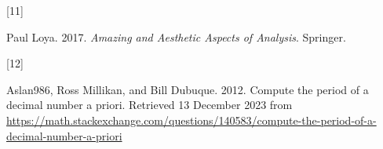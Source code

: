 \documentclass[
  a4paper,
]{article}
\newlength{\cslhangindent}
\newlength{\csllabelwidth}
\newenvironment{CSLReferences}[2] %
 {\begin{list}{}{%
  \setlength{\itemindent}{0pt}
  \setlength{\leftmargin}{0pt}
  \setlength{\parsep}{0pt}
  \ifodd #1
   \setlength{\leftmargin}{\cslhangindent}
   \setlength{\itemindent}{-1\cslhangindent}
  \fi
  \setlength{\itemsep}{#2\baselineskip}}}
 {\end{list}}
\newcommand{\CSLLeftMargin}[1]{\parbox[t]{\csllabelwidth}{\strut#1\strut}}
\newcommand{\CSLRightInline}[1]{\parbox[t]{\linewidth - \csllabelwidth}{\strut#1\strut}}
\begin{document}
\begin{CSLReferences}{0}{0}
\CSLLeftMargin{{[}11{]} }%
\CSLRightInline{Paul Loya. 2017. \emph{{Amazing and Aesthetic Aspects of
Analysis}}. Springer.}

\CSLLeftMargin{{[}12{]} }%
\CSLRightInline{Aslan986, Ross Millikan, and Bill Dubuque. 2012.
{Compute the period of a decimal number a priori}. Retrieved 13 December
2023
from\href{\%0A\%20\%20\%20\%20\%20\%20\%20\%20\%20https://math.stackexchange.com/questions/140583/compute-the-period-of-a-decimal-number-a-priori\%0A\%20\%20\%20\%20\%20\%20\%20\%20\%20}{
https://math.stackexchange.com/questions/140583/compute-the-period-of-a-decimal-number-a-priori
}}

\end{CSLReferences}
\end{document}

